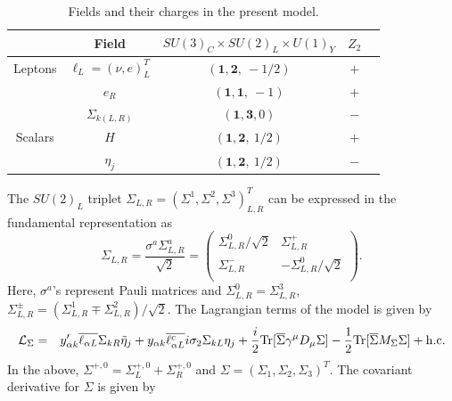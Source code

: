 \documentclass[aps, a4paper,superscriptaddress,12pt,preprintnumbers,floatfix,nofootinbib,amsmath,amssymb]{revtex4}
\begin{document}
\begin{table}[htb]
\caption{Fields and their charges in the present model.}
\begin{center}
\begin{tabular}{|c|c|c|c|c|}
	\hline
			& Field	& $ SU(3)_C \times SU(2)_L\times U(1)_Y$ & $Z_2$\\
	\hline
	\hline
	Leptons	& $\ell_{L} = (\nu, e)^T_L$	& $(\textbf{1},\textbf{2},~  -1/2)$ & $+$\\
			& $e_R$							& $(\textbf{1},\textbf{1},~  -1)$	& $+$\\
	&  $\Sigma_{k(L,R)}$ & $(\textbf{1},\textbf{3},0)$ & $-$ \\
\hline	
	Scalars	& $H$							& $(\textbf{1},\textbf{2},~ 1/2)$	&  $+$\\ 
					& $\eta_j$							& $(\textbf{1},\textbf{2},~ 1/2)$	& $-$\\
			\hline
	\hline
\end{tabular}
\label{typeiii_model}
\end{center}
\end{table}
The $SU(2)_L$ triplet $\Sigma_{L,R} = \left(\Sigma^1,\Sigma^2,\Sigma^3 \right)_{L,R}^T$ can be expressed in the fundamental representation as
\begin{equation}
\Sigma_{L,R} = \frac{\sigma^a \Sigma^a_{L,R}}{\sqrt{2}} = \begin{pmatrix}
		 \Sigma^0_{L,R}/\sqrt{2}	& \Sigma^+_{L,R}	\\
		 \Sigma^-_{L,R}	& -\Sigma^0_{L,R}/\sqrt{2}	\\
	\end{pmatrix}.
\end{equation}
Here, $\sigma^a$'s represent Pauli matrices and $\Sigma^0_{L,R} = \Sigma^3_{L,R}$, $\Sigma^{\pm}_{L,R} = \left(\Sigma^1_{L,R} \mp \Sigma^2_{L,R} \right)/\sqrt{2}$. The Lagrangian terms of the model is given by
\begin{eqnarray}
\mathcal{L}_{\Sigma} &=& y^\prime_{\alpha k} \overline{\ell_{\alpha L}}\Sigma_{kR} \tilde{\eta}_{j} + y_{\alpha k} \overline{\ell^c_{\alpha L}}i\sigma_2 \Sigma_{kL} \eta_{j}  + \frac{i}{2}{\rm Tr}[\overline{\Sigma}\gamma^\mu D_\mu\Sigma] - \frac{1}{2}{\rm Tr}[\overline{\Sigma}M_\Sigma\Sigma] + {\rm h.c.}
\end{eqnarray}
In the above, $\Sigma^{+,0} = \Sigma_L^{+,0} + \Sigma_R^{+,0}$   and $\Sigma = (\Sigma_1,\Sigma_2,\Sigma_3)^T$. The covariant derivative for $\Sigma$ is given by
\end{document}
